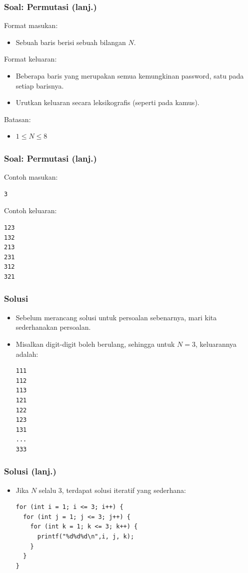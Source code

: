\begin{frame}
\frametitle{Soal: Permutasi (lanj.) }
Format masukan:
\begin{itemize}
    \item Sebuah baris berisi sebuah bilangan $N$.
\end{itemize}
Format keluaran:
\begin{itemize}
    \item Beberapa baris yang merupakan semua kemungkinan password, satu pada setiap barisnya.
    \item Urutkan keluaran secara leksikografis (seperti pada kamus).
\end{itemize}
Batasan:
\begin{itemize}
    \item $1 \le N \le 8$
\end{itemize}
\end{frame}

\begin{frame}[fragile]
\frametitle{Soal: Permutasi (lanj.) }
Contoh masukan:
\begin{lstlisting}
3
\end{lstlisting}

\vfill

Contoh keluaran:
\begin{lstlisting}
123
132
213
231
312
321
\end{lstlisting}
\end{frame}

\begin{frame}[fragile]
\frametitle{Solusi}
\begin{itemize}
  \item Sebelum merancang solusi untuk persoalan sebenarnya, mari kita sederhanakan persoalan.
  \item Misalkan digit-digit boleh berulang, sehingga untuk $N=3$, keluarannya adalah:
  
\begin{lstlisting}
111
112
113
121
122
123
131
...
333
\end{lstlisting}
\end{itemize}
\end{frame}

\begin{frame}[fragile]
\frametitle{Solusi (lanj.)}
\begin{itemize}
  \item Jika $N$ selalu 3, terdapat solusi iteratif yang sederhana:
  
\begin{lstlisting}
for (int i = 1; i <= 3; i++) {
  for (int j = 1; j <= 3; j++) {
    for (int k = 1; k <= 3; k++) {
      printf("%d%d%d\n",i, j, k);
    }
  }
}
\end{lstlisting}
\end{itemize}
\end{frame}

